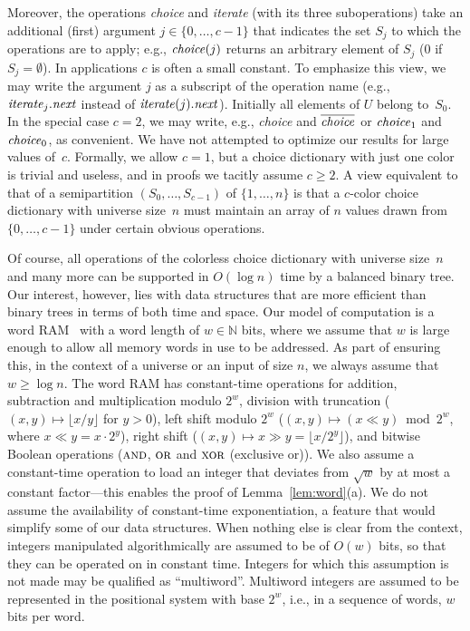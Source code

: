 \documentclass[envcountsame,envcountsect,undated,nolinenumbers]{lnthi}
\def\Tvn#1{\hbox{\textit{#1\/}}}
\def\Tfloor#1{\lfloor #1\rfloor}
\def\TbbbN{\mathbb{N}}
\begin{document}
Moreover,
the operations \Tvn{choice} and \Tvn{iterate}
(with its three suboperations) take an additional
(first) argument $j\in\{0,\ldots,c-1\}$
that indicates the set $S_j$ to which the
operations are to apply;
e.g., $\Tvn{choice}(j)$ returns an arbitrary
element of $S_j$ (0 if $S_j=\emptyset$).
In applications $c$ is often a small constant.
To emphasize this view, we may write the argument $j$
as a subscript of the operation name
(e.g., $\Tvn{iterate}_j.\Tvn{next}$
instead of $\Tvn{iterate}(j).\Tvn{next}$).
Initially all elements of $U$ belong to~$S_0$.
In the special case $c=2$, we may write, e.g.,
\Tvn{choice} and $\cchoice$ or
$\Tvn{choice}_1$ and $\Tvn{choice}_0$, as convenient.
We have not attempted to optimize our results
for large values of~$c$.
Formally, we allow $c=1$, but a choice dictionary
with just one color is trivial and useless,
and in proofs we tacitly assume $c\ge 2$.
A view equivalent to that of a semipartition
$(S_0,\ldots,S_{c-1})$ of $\{1,\ldots,n\}$
is that a $c$-color choice dictionary with
universe size~$n$ must
maintain an array of $n$ values drawn from
$\{0,\ldots,c-1\}$ under certain
obvious operations.

Of course, all operations of the
colorless choice
dictionary with universe size~$n$ and many more can be supported in
$O(\log n)$ time by a balanced binary tree.
Our interest, however, lies with data structures that
are more efficient than binary trees in terms of
both time and space.
Our model of computation is a word RAM~\cite{AngV79,Hag98}
with a word length of $w\in\TbbbN$ bits, where we assume that $w$ is
large enough to allow all memory words in use to be addressed.
As part of ensuring this, in the context of a universe or
an input of size $n$, we always assume that
$w\ge\log n$.
The word RAM has constant-time operations
for addition, subtraction and multiplication
modulo $2^w$, division with truncation
($(x,y)\mapsto\Tfloor{{x/y}}$ for $y>0$),
left shift modulo $2^w$
($(x,y)\mapsto (x\ll y)\bmod 2^w$,
where $x\ll y=x\cdot 2^y$),
right shift
($(x,y)\mapsto x\gg y=\Tfloor{{x/{2^y}}}$),
and bitwise Boolean operations
($\textsc{and}$, $\textsc{or}$ and $\textsc{xor}$
(exclusive or)).
We also assume a constant-time operation to
load an integer that deviates from $\sqrt{w}$
by at most a constant factor---this enables the
proof of Lemma~\ref{lem:word}(a).
We do not assume the availability of
constant-time exponentiation,
a feature that would simplify some of
our data structures.
When nothing else is clear from the context,
integers manipulated algorithmically are assumed
to be of $O(w)$ bits, so that they can be
operated on in constant time.
Integers for which this assumption is not
made may be qualified as ``multiword''.
Multiword integers are assumed to be represented
in the positional system with base
$2^w$, i.e., in
a sequence of words, $w$ bits per word.
\end{document}
